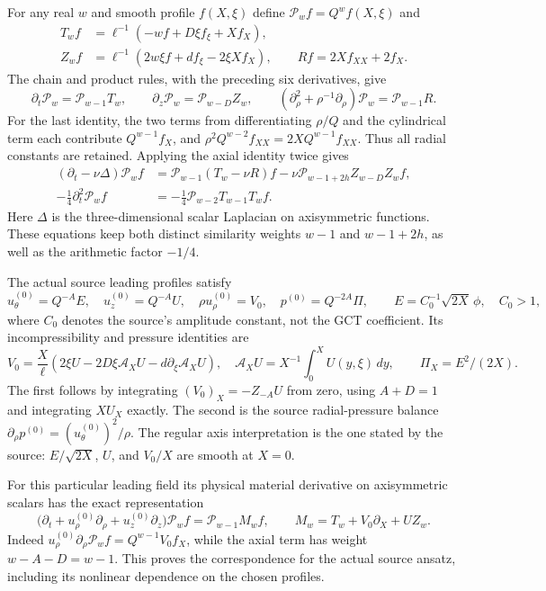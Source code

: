 For any real $w$ and smooth profile $f(X,\xi)$ define
$\mathcal P_w f=Q^w f(X,\xi)$ and
\begin{align*}
 T_wf&=\ell^{-1}(-wf+D\xi f_\xi+Xf_X),\\
 Z_wf&=\ell^{-1}(2w\xi f+d f_\xi-2\xi Xf_X),\qquad
 Rf=2Xf_{XX}+2f_X.
\end{align*}
The chain and product rules, with the preceding six derivatives, give
\begin{equation}\label{eq:ns-profile-operators-exact}
 \partial_t\mathcal P_w=\mathcal P_{w-1}T_w,
 \qquad \partial_z\mathcal P_w=\mathcal P_{w-D}Z_w,
 \qquad
 (\partial_\rho^2+\rho^{-1}\partial_\rho)\mathcal P_w
       =\mathcal P_{w-1}R.
\end{equation}
For the last identity, the two terms from differentiating $\rho/Q$
and the cylindrical term each contribute $Q^{w-1}f_X$, and
$\rho^2Q^{w-2}f_{XX}=2XQ^{w-1}f_{XX}$. Thus all radial constants
are retained. Applying the axial identity twice gives
\begin{align}
 (\partial_t-\nu\Delta)\mathcal P_w f
 &=\mathcal P_{w-1}(T_w-\nu R)f
     -\nu\mathcal P_{w-1+2h}Z_{w-D}Z_wf,
       \label{eq:ns-profile-heat-full}\\
 -\tfrac14\partial_t^2\mathcal P_w f
 &=-\tfrac14\mathcal P_{w-2}T_{w-1}T_wf.
       \label{eq:ns-profile-arithmetic-full}
\end{align}
Here $\Delta$ is the three-dimensional scalar Laplacian on
axisymmetric functions. These equations keep both distinct similarity
weights $w-1$ and $w-1+2h$, as well as the arithmetic factor $-1/4$.

The actual source leading profiles satisfy
\[
 u^{(0)}_\theta=Q^{-A}E,\quad u^{(0)}_z=Q^{-A}U,
 \quad \rho u^{(0)}_\rho=V_0,\quad p^{(0)}=Q^{-2A}\Pi,
 \qquad E=C_0^{-1}\sqrt{2X}\,\phi,\quad C_0>1,
\]
where $C_0$ denotes the source's amplitude constant, not the GCT
coefficient. Its incompressibility and pressure identities are
\[
 V_0=\frac X\ell\left(2\xi U-2D\xi\mathcal A_XU
                   -d\partial_\xi\mathcal A_XU\right),\quad
 \mathcal A_XU=X^{-1}\int_0^XU(y,\xi)\,dy,\qquad
 \Pi_X=E^2/(2X).
\]
The first follows by integrating
$(V_0)_X=-Z_{-A}U$ from zero, using $A+D=1$ and
integrating $XU_X$ exactly. The second is the source radial-pressure
balance $\partial_\rho p^{(0)}=(u^{(0)}_\theta)^2/\rho$.
The regular axis interpretation is the one stated by the source:
$E/\sqrt{2X}$, $U$, and $V_0/X$ are smooth at $X=0$.

For this particular leading field its physical material derivative on
axisymmetric scalars has the exact representation
\begin{equation}\label{eq:ns-source-material-profile}
 \bigl(\partial_t+u^{(0)}_\rho\partial_\rho
                     +u^{(0)}_z\partial_z\bigr)\mathcal P_w f
   =\mathcal P_{w-1}M_wf,\qquad
 M_w=T_w+V_0\partial_X+U Z_w.
\end{equation}
Indeed $u^{(0)}_\rho\partial_\rho\mathcal P_wf
=Q^{w-1}V_0f_X$, while the axial term has weight
$w-A-D=w-1$. This proves the correspondence for the actual source
ansatz, including its nonlinear dependence on the chosen profiles.

